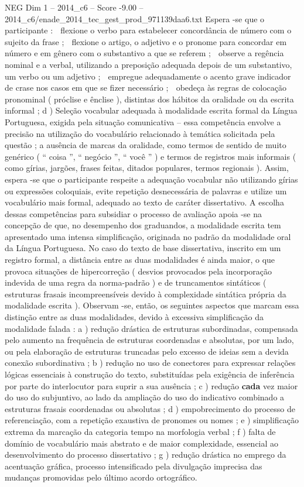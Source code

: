 \begin{textsample}{NEG Dim 1 – 2014\_c6 – Score -9.00 – 2014\_c6/enade\_2014\_tec\_gest\_prod\_971139daa6.txt}
Espera -se que o participante :  flexione o verbo para estabelecer concordância de número com o sujeito da frase ;  flexione o artigo, o adjetivo e o pronome para concordar em número e em gênero com o substantivo a que se referem ;  observe a regência nominal e a verbal, utilizando a preposição adequada depois de um substantivo, um verbo ou um adjetivo ;  empregue adequadamente o acento grave indicador de crase nos casos em que se fizer necessário ;  obedeça às regras de colocação pronominal ( próclise e ênclise ), distintas dos hábitos da oralidade ou da escrita informal ; d ) Seleção vocabular adequada à modalidade escrita formal da Língua Portuguesa, exigida pela situação comunicativa – essa competência envolve a precisão na utilização do vocabulário relacionado à temática solicitada pela questão ; a ausência de marcas da oralidade, como termos de sentido de muito genérico ( “ coisa ”, “ negócio ”, “ você ” ) e termos de registros mais informais ( como gírias, jargões, frases feitas, ditados populares, termos regionais ).
Assim, espera -se que o participante respeite a adequação vocabular não utilizando gírias ou expressões coloquiais, evite repetição desnecessária de palavras e utilize um vocabulário mais formal, adequado ao texto de caráter dissertativo.
A escolha dessas competências para subsidiar o processo de avaliação apoia -se na concepção de que, no desempenho dos graduandos, a modalidade escrita tem apresentado uma intensa simplificação, originada no padrão da modalidade oral da Língua Portuguesa.
No caso do texto de base dissertativa, inscrito em um registro formal, a distância entre as duas modalidades é ainda maior, o que provoca situações de hipercorreção ( desvios provocados pela incorporação indevida de uma regra da norma-padrão ) e de truncamentos sintáticos ( estruturas frasais incompreensíveis devido à complexidade sintática própria da modalidade escrita ).
Observam -se, então, os seguintes aspectos que marcam essa distinção entre as duas modalidades, devido à excessiva simplificação da modalidade falada : a ) redução drástica de estruturas subordinadas, compensada pelo aumento na frequência de estruturas coordenadas e absolutas, por um lado, ou pela elaboração de estruturas truncadas pelo excesso de ideias sem a devida conexão subordinativa ; b ) redução no uso de conectores para expressar relações lógicas essenciais à construção do texto, substituídas pela exigência de inferência por parte do interlocutor para suprir a sua ausência ; c ) redução \textbf{cada} vez maior do uso do subjuntivo, ao lado da ampliação do uso do indicativo combinado a estruturas frasais coordenadas ou absolutas ; d ) empobrecimento do processo de referenciação, com a repetição exaustiva de pronomes ou nomes ; e ) simplificação extrema da marcação da categoria tempo na morfologia verbal ; f ) falta de domínio de vocabulário mais abstrato e de maior complexidade, essencial ao desenvolvimento do processo dissertativo ; g ) redução drástica no emprego da acentuação gráfica, processo intensificado pela divulgação imprecisa das mudanças promovidas pelo último acordo ortográfico.

\end{textsample}

